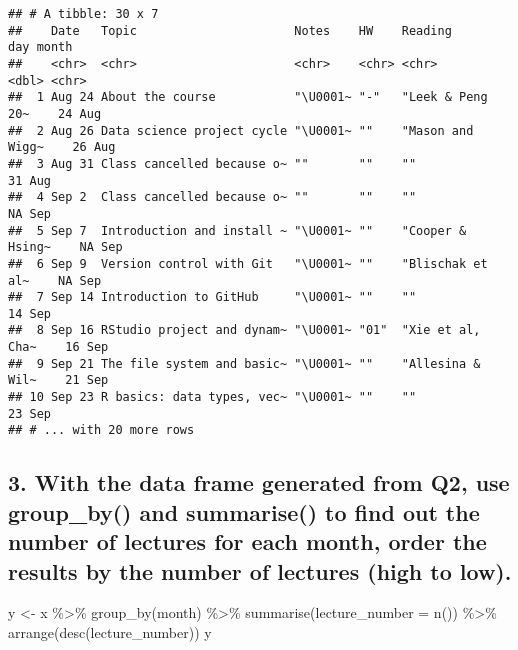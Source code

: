 \documentclass[
]{article}
\newenvironment{Shaded}{\begin{snugshade}}{\end{snugshade}}
\newcommand{\AttributeTok}[1]{\textcolor[rgb]{0.77,0.63,0.00}{#1}}
\newcommand{\FunctionTok}[1]{\textcolor[rgb]{0.00,0.00,0.00}{#1}}
\newcommand{\NormalTok}[1]{#1}
\newcommand{\OtherTok}[1]{\textcolor[rgb]{0.56,0.35,0.01}{#1}}
\newcommand{\SpecialCharTok}[1]{\textcolor[rgb]{0.00,0.00,0.00}{#1}}
\begin{document}
\begin{Shaded}
\end{Shaded}

\begin{verbatim}
## # A tibble: 30 x 7
##    Date   Topic                      Notes    HW    Reading            day month
##    <chr>  <chr>                      <chr>    <chr> <chr>            <dbl> <chr>
##  1 Aug 24 About the course           "\U0001~ "-"   "Leek & Peng 20~    24 Aug  
##  2 Aug 26 Data science project cycle "\U0001~ ""    "Mason and Wigg~    26 Aug  
##  3 Aug 31 Class cancelled because o~ ""       ""    ""                  31 Aug  
##  4 Sep 2  Class cancelled because o~ ""       ""    ""                  NA Sep  
##  5 Sep 7  Introduction and install ~ "\U0001~ ""    "Cooper & Hsing~    NA Sep  
##  6 Sep 9  Version control with Git   "\U0001~ ""    "Blischak et al~    NA Sep  
##  7 Sep 14 Introduction to GitHub     "\U0001~ ""    ""                  14 Sep  
##  8 Sep 16 RStudio project and dynam~ "\U0001~ "01"  "Xie et al, Cha~    16 Sep  
##  9 Sep 21 The file system and basic~ "\U0001~ ""    "Allesina & Wil~    21 Sep  
## 10 Sep 23 R basics: data types, vec~ "\U0001~ ""    ""                  23 Sep  
## # ... with 20 more rows
\end{verbatim}

\hypertarget{with-the-data-frame-generated-from-q2-use-group_by-and-summarise-to-find-out-the-number-of-lectures-for-each-month-order-the-results-by-the-number-of-lectures-high-to-low.}{%
\subsection{3. With the data frame generated from Q2, use group\_by()
and summarise() to find out the number of lectures for each month, order
the results by the number of lectures (high to
low).}\label{with-the-data-frame-generated-from-q2-use-group_by-and-summarise-to-find-out-the-number-of-lectures-for-each-month-order-the-results-by-the-number-of-lectures-high-to-low.}}

\begin{Shaded}
\begin{Highlighting}[]
\NormalTok{y }\OtherTok{\textless{}{-}}\NormalTok{ x }\SpecialCharTok{\%\textgreater{}\%} \FunctionTok{group\_by}\NormalTok{(month) }\SpecialCharTok{\%\textgreater{}\%} \FunctionTok{summarise}\NormalTok{(}\AttributeTok{lecture\_number =} \FunctionTok{n}\NormalTok{()) }\SpecialCharTok{\%\textgreater{}\%} \FunctionTok{arrange}\NormalTok{(}\FunctionTok{desc}\NormalTok{(lecture\_number))}
\NormalTok{y}
\end{Highlighting}
\end{Shaded}
\end{document}
